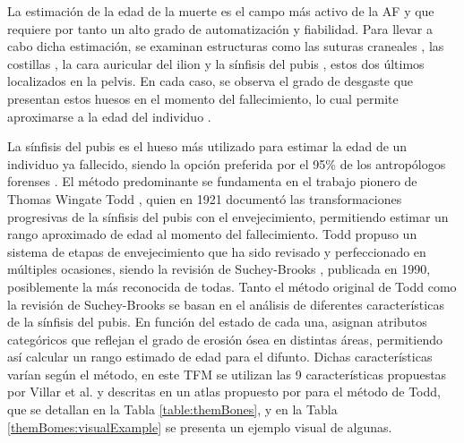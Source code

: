La estimación de la edad de la muerte es el campo más activo de la AF \cite{ubelaker_recent_2020} y que requiere por tanto un alto grado de automatización y fiabilidad. Para llevar a cabo dicha estimación, se examinan estructuras como las suturas craneales \cite{skullAF}, las costillas \cite{icscan1984age}, la cara auricular del ilion \cite{buckberry_age_2002} y la sínfisis del pubis \cite{garvin_current_2012}, estos dos últimos localizados en la pelvis. En cada caso, se observa el grado de desgaste que presentan estos huesos en el momento del fallecimiento, lo cual permite aproximarse a la edad del individuo \cite{RefWorks:RefID:12-black2011forensic}.

La sínfisis del pubis es el hueso más utilizado para estimar la edad de un individuo ya fallecido, siendo la opción preferida por el 95\% de los antropólogos forenses \cite{garvin_current_2012}. El método predominante se fundamenta en el trabajo pionero de Thomas Wingate Todd \cite{RefWorks:RefID:19-todd1921age}, quien en 1921 documentó las transformaciones progresivas de la sínfisis del pubis con el envejecimiento, permitiendo estimar un rango aproximado de edad al momento del fallecimiento. Todd propuso un sistema de etapas de envejecimiento que ha sido revisado y perfeccionado en múltiples ocasiones, siendo la revisión de Suchey-Brooks \cite{RefWorks:RefID:20-brooks1990skeletal}, publicada en 1990, posiblemente la más reconocida de todas. Tanto el método original de Todd como la revisión de Suchey-Brooks se basan en el análisis de diferentes características de la sínfisis del pubis. En función del estado de cada una, asignan atributos categóricos que reflejan el grado de erosión ósea en distintas áreas, permitiendo así calcular un rango estimado de edad para el difunto. Dichas características varían según el método, en este TFM se utilizan las 9 características propuestas por Villar et al. \cite{villar2017first} y descritas en un atlas propuesto por \cite{irurita2025pubic} para el método de Todd, que se detallan en la Tabla \ref{table:themBones}, y en la Tabla \ref{themBomes:visualExample} se presenta un ejemplo visual de algunas.

